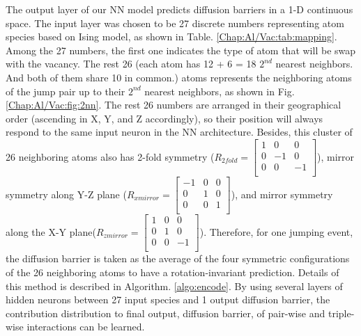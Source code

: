 The output layer of our \ac{NN} model predicts diffusion barriers in a 1-D continuous space. The input layer was chosen to be 27 discrete numbers representing atom species based on Ising model, as shown in Table. \ref{Chap:Al/Vac:tab:mapping}. Among the 27 numbers, the first one indicates the type of atom that will be swap with the vacancy. The rest 26 (each atom has 12 + 6 = 18 $\text{2}^{nd}$ nearest neighbors. And both of them share 10 in common.) atoms represents the neighboring atoms of the jump pair up to their $\text{2}^{nd}$ nearest neighbors, as shown in Fig. \ref{Chap:Al/Vac:fig:2nn}. The rest 26 numbers are arranged in their geographical order (ascending in X, Y, and Z accordingly), so their position will always respond to the same input neuron in the \ac{NN} architecture. Besides, this cluster of 26 neighboring atoms also has 2-fold symmetry  ($R_{2 fold} = \begin{bmatrix} 1 & 0 & 0 \\0 & -1 & 0 \\0 & 0 & -1 \\\end{bmatrix}$), mirror symmetry along Y-Z plane ($R_{x mirror} = \begin{bmatrix} -1 & 0 & 0 \\0 & 1 & 0 \\0 & 0 & 1 \\\end{bmatrix}$), and mirror symmetry along the X-Y plane($R_{z mirror} = \begin{bmatrix} 1 & 0 & 0 \\0 & 1 & 0 \\0 & 0 & -1 \\\end{bmatrix}$). Therefore, for one jumping event, the diffusion barrier is taken as the average of the four symmetric configurations of the 26 neighboring atoms to have a rotation-invariant prediction. Details of this method is described in Algorithm. \ref{algo:encode}. By using several layers of hidden neurons between 27 input species and 1 output diffusion barrier, the contribution distribution to final output, diffusion barrier, of pair-wise and triple-wise interactions can be learned.

